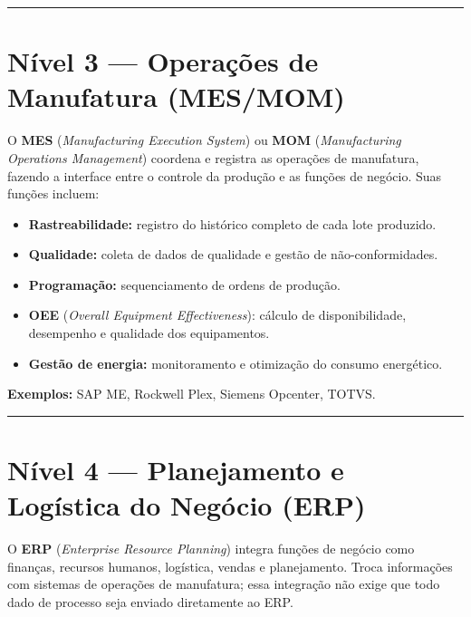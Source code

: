 \begin{center}\rule{0.5\linewidth}{0.5pt}\end{center}

\section{\texorpdfstring{Nível 3 --- Operações de Manufatura (MES/MOM)}{Nível 3  Operações de Manufatura (MES/MOM)}}\label{nuxedvel-3-operauxe7uxf5es-de-manufatura-mesmom}

O \textbf{MES} (\emph{Manufacturing Execution System}) ou \textbf{MOM} (\emph{Manufacturing Operations Management}) coordena e registra as operações de manufatura, fazendo a interface entre o controle da produção e as funções de negócio. Suas funções incluem:

\begin{itemize}
\tightlist
\item
  \textbf{Rastreabilidade:} registro do histórico completo de cada lote produzido.
\item
  \textbf{Qualidade:} coleta de dados de qualidade e gestão de não-conformidades.
\item
  \textbf{Programação:} sequenciamento de ordens de produção.
\item
  \textbf{OEE} (\emph{Overall Equipment Effectiveness}): cálculo de disponibilidade, desempenho e qualidade dos equipamentos.
\item
  \textbf{Gestão de energia:} monitoramento e otimização do consumo energético.
\end{itemize}

\textbf{Exemplos:} SAP ME, Rockwell Plex, Siemens Opcenter, TOTVS.

\begin{center}\rule{0.5\linewidth}{0.5pt}\end{center}

\section{\texorpdfstring{Nível 4 --- Planejamento e Logística do Negócio (ERP)}{Nível 4  Planejamento e Logística do Negócio (ERP)}}\label{nuxedvel-4-planejamento-e-loguxedstica-do-neguxf3cio-erp}

O \textbf{ERP} (\emph{Enterprise Resource Planning}) integra funções de negócio como finanças, recursos humanos, logística, vendas e planejamento. Troca informações com sistemas de operações de manufatura; essa integração não exige que todo dado de processo seja enviado diretamente ao ERP.

